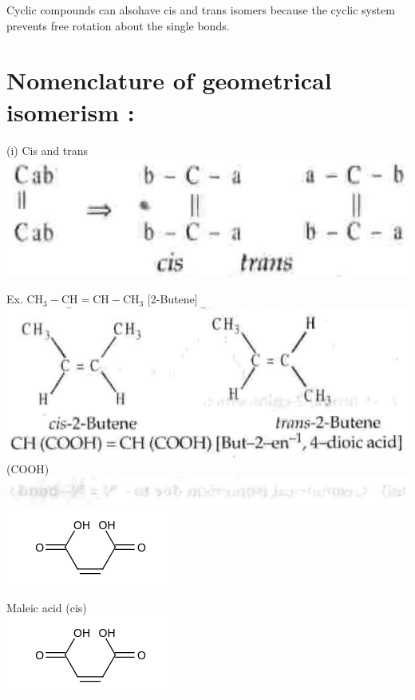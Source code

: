 \documentclass[10pt]{article}
\begin{document}
Cyclic compounds can alsohave cis and trans isomers because the cyclic system prevents free rotation about the single bonds.

\section*{Nomenclature of geometrical isomerism :}
(i) Cis and trans\\
\includegraphics[max width=\textwidth, center]{2025_01_28_8470952b98110cec3aabg-045(2)}

Ex. $\mathrm{CH}_{3}-\mathrm{CH}=\mathrm{CH}-\mathrm{CH}_{3}$ [2-Butene]\\
\includegraphics[max width=\textwidth, center]{2025_01_28_8470952b98110cec3aabg-045(3)}\\
(COOH)\\
\includegraphics[max width=\textwidth, center]{2025_01_28_8470952b98110cec3aabg-045(1)}\\
\includegraphics{smile-3ff2411546209f6a06a7226cb5a18f4c541ac619}

Maleic acid (cis)\\
\includegraphics{smile-21929b28f9b39df557fbc2dc09eeb7d13f4584c4}
\end{document}
